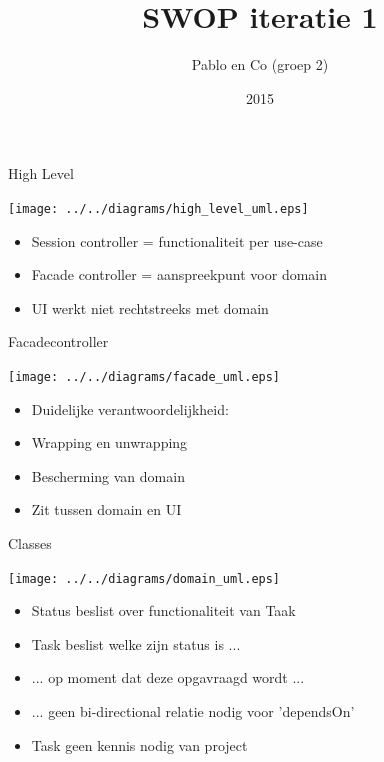 \documentclass[mathserif,serif]{beamer}
\title{SWOP iteratie 1}
\author{Pablo en Co (groep 2)}
\institute{KU Leuven}
\date{2015}
\begin{document}
  \frame{\titlepage}

  \begin{frame}{High Level}
      \begin{center}
      \texttt{[image: ../../diagrams/high\_level\_uml.eps]}
        \begin{itemize}
        \item Session controller = functionaliteit per use-case
        \item Facade controller = aanspreekpunt voor domain
        \item UI werkt niet rechtstreeks met domain
        \end{itemize}
      \end{center}
  \end{frame}

  \begin{frame}{Facadecontroller}
      \begin{center}
      \texttt{[image: ../../diagrams/facade\_uml.eps]}
        \begin{itemize}
        \item Duidelijke verantwoordelijkheid:
        \item Wrapping en unwrapping
        \item Bescherming van domain
        \item Zit tussen domain en UI
        \end{itemize}
      \end{center}
  \end{frame}

  \begin{frame}{Classes}
      \begin{center}
      \texttt{[image: ../../diagrams/domain\_uml.eps]}
        \begin{itemize}
        \item Status beslist over functionaliteit van Taak
        \item Task beslist welke zijn status is ...
        \item ... op moment dat deze opgavraagd wordt ...
        \item ... geen bi-directional relatie nodig voor 'dependsOn'
        \item Task geen kennis nodig van project
        \end{itemize}
      \end{center}
  \end{frame}
\end{document}
